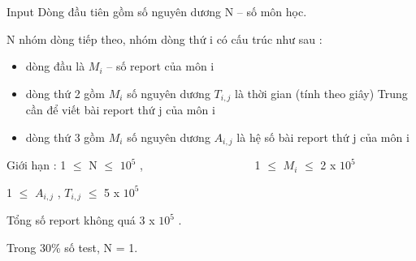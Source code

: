 Input
Dòng đầu tiên gồm số nguyên dương N – số môn học.


N nhóm dòng tiếp theo, nhóm dòng thứ i có cấu trúc như sau :
\begin{itemize}
	\item dòng đầu là $M_{i}$ – số report của môn i
	\item dòng thứ 2 gồm $M_{i}$ số nguyên dương $T_{i,j}$ là thời gian (tính theo giây) Trung cần để viết bài report thứ j của môn i
	\item dòng thứ 3 gồm $M_{i}$ số nguyên dương $A_{i,j}$ là hệ số bài report thứ j của môn i
\end{itemize}

Giới hạn : 1  $\le$  N  $\le$  $10^{5}$ ,                    1  $\le$  $M_{i}$  $\le$  2 x $10^{5}$


1  $\le$  $A_{i,j}$ , $T_{i,j}$  $\le$  5 x $10^{5}$


Tổng số report không quá 3 x $10^{5}$ .


Trong 30\% số test, N = 1.